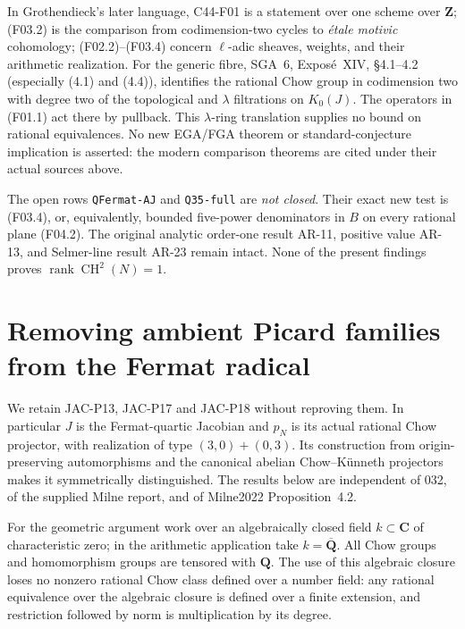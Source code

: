 \documentclass[11pt]{article}
\theoremstyle{remark}\newtheorem{remark}[theorem]{Remark}
\begin{document}
In Grothendieck's later language, C44-F01 is a statement over
one scheme over $\mathbf Z$; (F03.2) is the comparison from
codimension-two cycles to \emph{\'etale motivic} cohomology;
(F02.2)--(F03.4) concern $\ell$-adic sheaves, weights, and their
arithmetic realization.  For the generic fibre, SGA~6,
Expos\'e~XIV, \S4.1--4.2 (especially (4.1) and (4.4)),
identifies the rational Chow group in codimension two with
degree two of the topological and $\lambda$ filtrations on
$K_0(J)$.  The operators in (F01.1) act there by pullback.
This $\lambda$-ring translation supplies no bound on rational
equivalences.  No new EGA/FGA theorem or standard-conjecture
implication is asserted: the modern comparison theorems are
cited under their actual sources above.

The open rows \texttt{QFermat-AJ} and \texttt{Q35-full} are
\emph{not closed}.  Their exact new test is (F03.4), or,
equivalently, bounded five-power denominators in $B$ on every
rational plane (F04.2).  The original analytic order-one result
AR-11, positive value AR-13, and Selmer-line result AR-23
remain intact.  None of the present findings proves
$\operatorname{rank}\operatorname{CH}^2(N)=1$.



\section{Removing ambient Picard families from the Fermat radical}

We retain JAC-P13, JAC-P17 and JAC-P18 without reproving them.
In particular $J$ is the Fermat-quartic Jacobian and $p_N$ is its
actual rational Chow projector, with realization of type
$(3,0)+(0,3)$.  Its construction from origin-preserving automorphisms
and the canonical abelian Chow--K\"unneth projectors makes it
symmetrically distinguished.  The results below are independent of
032, of the supplied Milne report, and of Milne2022 Proposition~4.2.

For the geometric argument work over an algebraically closed field
$k\subset\mathbf C$ of characteristic zero; in the arithmetic
application take $k=\overline{\mathbf Q}$.  All Chow groups and
homomorphism groups are tensored with $\mathbf Q$.  The use of this
algebraic closure loses no nonzero rational Chow class defined over
a number field: any rational equivalence over the algebraic closure
is defined over a finite extension, and restriction followed by norm
is multiplication by its degree.
\end{document}
